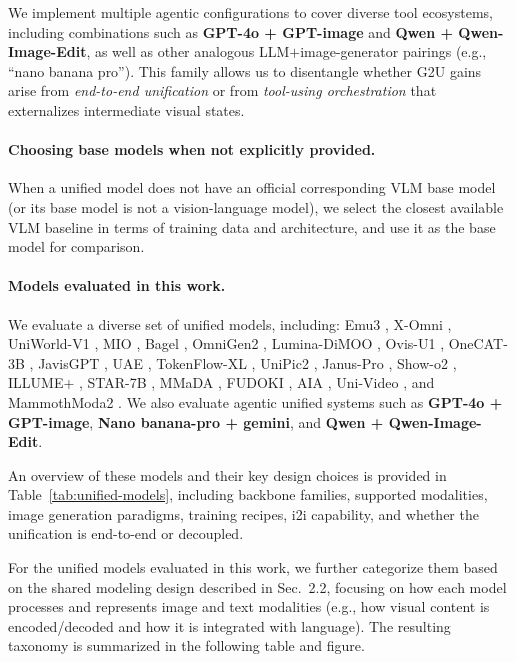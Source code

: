 \documentclass{article}
\theoremstyle{plain}
\theoremstyle{definition}
\theoremstyle{remark}
\begin{document}
We implement multiple agentic configurations to cover diverse tool ecosystems, including combinations such as \textbf{GPT-4o + GPT-image} and \textbf{Qwen + Qwen-Image-Edit}, as well as other analogous LLM$+$image-generator pairings (e.g., ``nano banana pro''). This family allows us to disentangle whether G2U gains arise from \emph{end-to-end unification} or from \emph{tool-using orchestration} that externalizes intermediate visual states.

\paragraph{Choosing base models when not explicitly provided.}
When a unified model does not have an official corresponding VLM base model (or its base model is not a vision-language model), we select the closest available VLM baseline in terms of training data and architecture, and use it as the base
model for comparison.

\paragraph{Models evaluated in this work.}
We evaluate a diverse set of unified models, including: Emu3 \cite{wang2024emu3}, X-Omni \cite{geng2025xomni}, UniWorld-V1 \cite{lin2025uniworld}, MIO \cite{hu2025mio}, Bagel \cite{deng2025bagel}, OmniGen2 \cite{xiao2024omnigen}, Lumina-DiMOO \cite{xin2025luminadimoo}, Ovis-U1 \cite{wang2025ovisu1}, OneCAT-3B \cite{peng2025onecat}, JavisGPT \cite{liu2025javisgpt}, UAE \cite{yuan2025uae}, TokenFlow-XL \cite{li2024tokenflow}, UniPic2 \cite{peng2025unipic2}, Janus-Pro \cite{chen2025januspro}, Show-o2 \cite{xie2025showo2}, ILLUME+ \cite{zhang2025illume}, STAR-7B \cite{li2025star}, MMaDA \cite{yang2025mmada}, FUDOKI \cite{wang2025fudoki}, AIA \cite{zheng2025aia}, Uni-Video \cite{wei2025univideo}, and MammothModa2 \cite{shen2025mammothmoda2}. We also evaluate agentic unified systems such as \textbf{GPT-4o + GPT-image}, \textbf{Nano banana-pro + gemini}, and \textbf{Qwen + Qwen-Image-Edit}.

An overview of these models and their key design choices is provided in Table~\ref{tab:unified-models}, including backbone families, supported modalities, image generation paradigms, training recipes, i2i capability, and whether the unification is end-to-end or decoupled.

For the unified models evaluated in this work, we further categorize them based on the shared modeling design described in Sec.~2.2, focusing on how each model processes and represents image and text modalities (e.g., how visual content is encoded/decoded and how it is integrated with language). The resulting taxonomy is summarized in the following table and figure.
\end{document}
